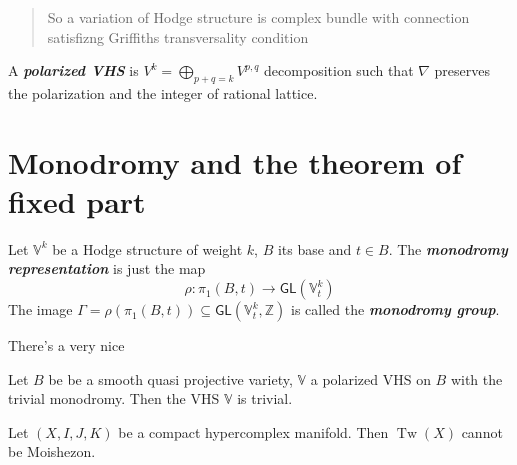 {\color{4}\begin{quotation}
	So a variation of Hodge structure is complex bundle with connection satisfizng Griffiths transversality condition
\end{quotation}}

\begin{defn}\leavevmode
	A \textit{\textbf{polarized VHS}} is  $V^k=\bigoplus_{p+q=k}V^{p,q}  $ decomposition such that $\nabla$ preserves the polarization and the integer of rational lattice.
\end{defn}

\section{Monodromy and the theorem of fixed part}

\begin{defn}\leavevmode
	Let $\mathbb{V}^k$ be a Hodge structure of weight $k$, $B$ its base and $t\in B$. The \textit{\textbf{monodromy representation}} is just the map
	\[\rho:\pi_{1}(B,t) \to \mathsf{GL}(\mathbb{V}^k_t)\]
	The image $\Gamma=\rho(\pi_{1}(B,t) )\subseteq \mathsf{GL}(\mathbb{V}^k_t,\mathbb{Z})$ is called the \textit{\textbf{monodromy group}}.
\end{defn}

There's a very nice
\begin{thm}[Deligne]\leavevmode
	Let $B$ be be a smooth quasi projective variety, $\mathbb{V}$ a polarized VHS on $B$ with the trivial monodromy. Then the VHS $\mathbb{V}$ is trivial.
\end{thm}

\begin{thm}\leavevmode
	Let $(X,I,J,K)$ be a compact hypercomplex manifold. Then  $\operatorname{Tw}(X)$ cannot be Moishezon.
\end{thm}


